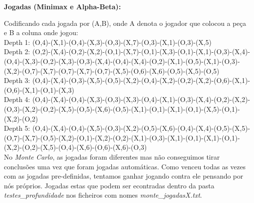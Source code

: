 \documentclass{article}
\begin{document}
\newpage
\begin{flushleft}
\textbf{Jogadas (Minimax e Alpha-Beta): }
\end{flushleft}
Codificando cada jogada por (A,B), onde A denota o jogador que colocou a peça e B a coluna onde jogou:\\[2mm]
Depth 1: (O,4)-(X,1)-(O,4)-(X,3)-(O,3)-(X,7)-(O,3)-(X,1)-(O,3)-(X,5)\\[2mm]
Depth 2: (O,2)-(X,4)-(O,2)-(X,2)-(O,1)-(X,7)-(O,1)-(X,3)-(O,1)-(X,1)-(O,3)-(X,4)-(O,4)-(X,3)-(O,2)-(X,3)-(O,3)-(X,4)-(O,4)-(X,4)-(O,2)-(X,1)-(O,5)-(X,1)-(O,3)-(X,2)-(O,7)-(X,7)-(O,7)-(X,7)-(O,7)-(X,5)-(O,6)-(X,6)-(O,5)-(X,5)-(O,5)\\[2mm]
Depth 3: (O,4)-(X,4)-(O,3)-(X,5)-(O,5)-(X,2)-(O,4)-(X,2)-(O,2)-(X,2)-(O,6)-(X,1)-(O,6)-(X,1)-(O,1)-(X,3)\\[2mm]
Depth 4: (O,4)-(X,4)-(O,4)-(X,3)-(O,3)-(X,3)-(O,4)-(X,1)-(O,3)-(X,4)-(O,2)-(X,2)-(O,3)-(X,2)-(O,2)-(X,5)-(O,5)-(X,6)-(O,5)-(X,1)-(O,1)-(X,1)-(O,1)-(X,5)-(O,1)-(X,2)-(O,2)\\[2mm]
Depth 5: (O,4)-(X,4)-(O,4)-(X,5)-(O,3)-(X,2)-(O,5)-(X,6)-(O,4)-(X,4)-(O,5)-(X,5)-(O,7)-(X,7)-(O,5)-(X,2)-(O,1)-(X,2)-(O,2)-(X,1)-(O,3)-(X,1)-(O,1)-(X,1)-(O,1)-(X,2)-(O,2)-(X,5)-(O,4)-(X,6)-(O,6)-(X,6)-(O,3)\\[5mm]
No \textit{Monte Carlo}, as jogadas foram diferentes mas não conseguimos tirar conclusões uma vez que foram jogadas automáticas. Como venceu todas as vezes com as jogadas pre-definidas, tentamos ganhar jogando contra ele pensando por nós próprios. Jogadas estas que podem ser econtradas dentro da pasta \textit{testes\_profundidade} nos ficheiros com nomes \textit{monte\_jogadasX.txt}.
\end{document}
